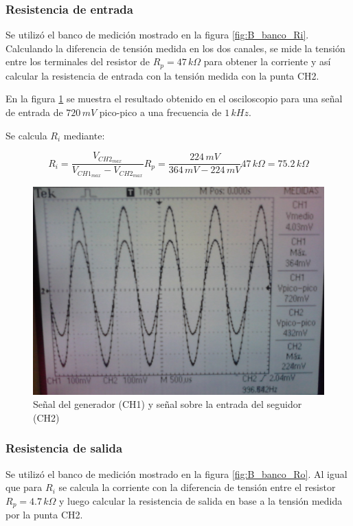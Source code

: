 \documentclass[10pt,spanish,a4paper,notitlepage]{article}
\begin{document}
\subsubsection{Resistencia de entrada}

Se utilizó el banco de medición mostrado en la figura \ref{fig:B_banco_Ri}.
Calculando la diferencia de tensión medida en los dos canales, se mide
la tensión entre los terminales del resistor de $R_p = 47\,\unit{k\Omega}$ para
obtener la corriente y así calcular la resistencia de entrada con la tensión
medida con la punta CH2.

En la figura \ref{fig:B_medicion_Ri} se muestra el resultado obtenido en el osciloscopio
para una señal de entrada de $720\,\unit{mV}$ pico-pico a una frecuencia de
$1\,\unit{kHz}$.

Se calcula $R_i$ mediante:

\[ \displaystyle R_i = \frac{V_{CH2_{max}}}{V_{CH1_{max}} - V_{CH2_{max}}} R_p = 
\frac{224\,\unit{mV}}{364\,\unit{mV} - 224\,\unit{mV}} 47\,\unit{k\Omega} = 
75.2\,\unit{k\Omega}\]

\begin{figure}[H]
\centering
\includegraphics[scale=0.12]{mediciones/3_acoplado_Ri.jpg}
\caption{Señal del generador (CH1) y señal sobre la entrada del seguidor (CH2)}
\label{fig:B_medicion_Ri}
\end{figure}

\subsubsection{Resistencia de salida}

Se utilizó el banco de medición mostrado en la figura \ref{fig:B_banco_Ro}.
Al igual que para $R_i$ se calcula la corriente con la diferencia de tensión
entre el resistor $R_p = 4.7\,\unit{k\Omega}$ y luego calcular la resistencia
de salida en base a la tensión medida por la punta CH2.
\end{document}

